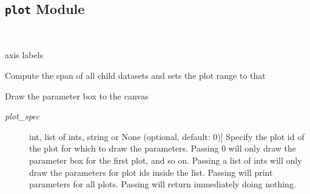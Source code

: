\documentclass[a4paper,10pt,english]{sphinxmanual}
\begin{document}
\subsection{\texttt{plot} Module}
\label{index:module-kafe.plot}\label{index:plot-module}\label{index:module-plot}

\begin{fulllineitems}
\label{index:kafe.plot.Plot}~

\begin{fulllineitems}
\label{index:kafe.plot.Plot.axis_labels}
axis labels

\end{fulllineitems}


\begin{fulllineitems}
\label{index:kafe.plot.Plot.compute_plot_range}
Compute the span of all child datasets and sets the plot range to that

\end{fulllineitems}


\begin{fulllineitems}
\label{index:kafe.plot.Plot.draw_fit_parameters_box}
Draw the parameter box to the canvas
\begin{description}
\item[{\emph{plot\_spec}}] \leavevmode{[}int, list of ints, string or None (optional, default: 0){]}
Specify the plot id of the plot for which to draw the parameters. Passing 0 will only draw the
parameter box for the first plot, and so on. Passing a list of ints will only draw the parameters
for plot ids inside the list. Passing  will print parameters for all plots. Passing
 will return immediately doing nothing.

\end{description}

\end{fulllineitems}


\end{fulllineitems}
\end{document}
